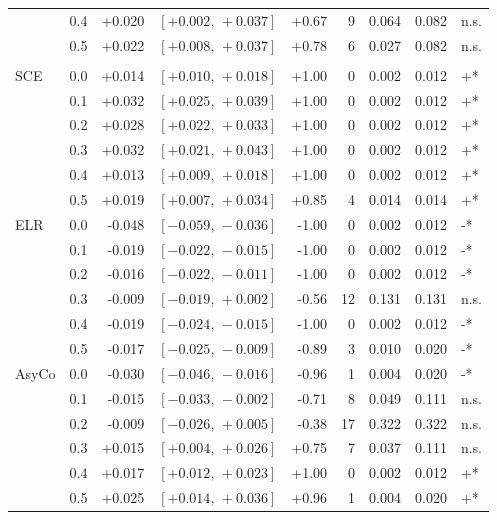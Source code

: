 \begin{small}
\begin{longtable}{llrrrrrrl}
 & 0.4 & +0.020 & $[+0.002,\,+0.037]$ & +0.67 & 9 & 0.064 & 0.082 & n.s. \\
 & 0.5 & +0.022 & $[+0.008,\,+0.037]$ & +0.78 & 6 & 0.027 & 0.082 & n.s. \\
\addlinespace
\multicolumn{9}{l}{\textit{Macro AUC}} \\
SCE & 0.0 & +0.014 & $[+0.010,\,+0.018]$ & +1.00 & 0 & 0.002 & 0.012 & +* \\
 & 0.1 & +0.032 & $[+0.025,\,+0.039]$ & +1.00 & 0 & 0.002 & 0.012 & +* \\
 & 0.2 & +0.028 & $[+0.022,\,+0.033]$ & +1.00 & 0 & 0.002 & 0.012 & +* \\
 & 0.3 & +0.032 & $[+0.021,\,+0.043]$ & +1.00 & 0 & 0.002 & 0.012 & +* \\
 & 0.4 & +0.013 & $[+0.009,\,+0.018]$ & +1.00 & 0 & 0.002 & 0.012 & +* \\
 & 0.5 & +0.019 & $[+0.007,\,+0.034]$ & +0.85 & 4 & 0.014 & 0.014 & +* \\
ELR & 0.0 & -0.048 & $[-0.059,\,-0.036]$ & -1.00 & 0 & 0.002 & 0.012 & -* \\
 & 0.1 & -0.019 & $[-0.022,\,-0.015]$ & -1.00 & 0 & 0.002 & 0.012 & -* \\
 & 0.2 & -0.016 & $[-0.022,\,-0.011]$ & -1.00 & 0 & 0.002 & 0.012 & -* \\
 & 0.3 & -0.009 & $[-0.019,\,+0.002]$ & -0.56 & 12 & 0.131 & 0.131 & n.s. \\
 & 0.4 & -0.019 & $[-0.024,\,-0.015]$ & -1.00 & 0 & 0.002 & 0.012 & -* \\
 & 0.5 & -0.017 & $[-0.025,\,-0.009]$ & -0.89 & 3 & 0.010 & 0.020 & -* \\
AsyCo & 0.0 & -0.030 & $[-0.046,\,-0.016]$ & -0.96 & 1 & 0.004 & 0.020 & -* \\
 & 0.1 & -0.015 & $[-0.033,\,-0.002]$ & -0.71 & 8 & 0.049 & 0.111 & n.s. \\
 & 0.2 & -0.009 & $[-0.026,\,+0.005]$ & -0.38 & 17 & 0.322 & 0.322 & n.s. \\
 & 0.3 & +0.015 & $[+0.004,\,+0.026]$ & +0.75 & 7 & 0.037 & 0.111 & n.s. \\
 & 0.4 & +0.017 & $[+0.012,\,+0.023]$ & +1.00 & 0 & 0.002 & 0.012 & +* \\
 & 0.5 & +0.025 & $[+0.014,\,+0.036]$ & +0.96 & 1 & 0.004 & 0.020 & +* \\
\end{longtable}
\end{small}
